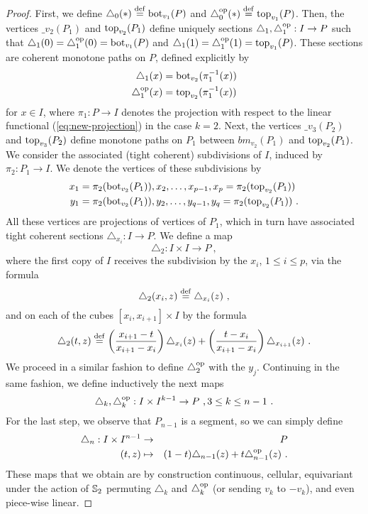 \begin{proof}
	First, we define $\triangle_0 (*) \stackrel{\mathrm{def}}{=} \operatorname{bot}_{v_1}(P)$ and $\triangle_0^{\mathrm{op}} (*) \stackrel{\mathrm{def}}{=} \operatorname{top}_{v_1}(P)$.
	Then, the vertices $\bm_{v_2}(P_1)$ and $\operatorname{top}_{v_2}(P_1)$ define uniquely sections $\triangle_1, \triangle_1^{\mathrm{op}} : I \to P$ such that $\triangle_1(0)=\triangle_1^{\mathrm{op}}(0)=\operatorname{bot}_{v_1}(P)$ and $\triangle_1(1)=\triangle_1^{\mathrm{op}}(1)=\operatorname{top}_{v_1}(P)$.
	These sections are coherent monotone paths on $P$, defined explicitly by
	\begin{align*}
		\triangle_1(x) & = \operatorname{bot}_{v_2}(\pi_1^{-1}(x)) \\
		\triangle_1^{\mathrm{op}}(x) & = \operatorname{top}_{v_2}(\pi_1^{-1}(x))
	\end{align*}
	for $x \in I$, where $\pi_1 : P \to I$ denotes the projection with respect to the linear functional (\ref{eq:new-projection}) in the case $k=2$.
	Next, the vertices $\bm_{v_3}(P_2)$ and $\operatorname{top}_{v_3}(P_2)$ define monotone paths on $P_1$ between $bm_{v_2}(P_1)$ and $\operatorname{top}_{v_2}(P_1)$.
	We consider the associated (tight coherent) subdivisions of $I$, induced by $\pi_2 : P_1 \to I$.
	We denote the vertices of these subdivisions by
	\begin{align*}
		x_1 & =\pi_2(\operatorname{bot}_{v_2}(P_1)), x_2, \ldots, x_{p-1}, x_p=\pi_2(\operatorname{top}_{v_2}(P_1)) \\
		y_1 & = \pi_2(\operatorname{bot}_{v_2}(P_1)), y_2, \ldots, y_{q-1}, y_q=\pi_2(\operatorname{top}_{v_2}(P_1)) \ .
	\end{align*}
	All these vertices are projections of vertices of $P_1$, which in turn have associated tight coherent sections $\triangle_{x_i}: I \to P$.
	We define a map
	\[
	\triangle_2 : I \times I \to P \ ,
	\]
	where the first copy of $I$ receives the subdivision by the $x_i$, $1\leq i \leq p$, via the formula
	\[
	\triangle_2(x_i, z) \stackrel{\mathrm{def}}{=} \triangle_{x_i}(z) \ ,
	\]
	and on each of the cubes $[x_i,x_{i+1}]\times I$ by the formula
	\[
	\triangle_2(t,z) \stackrel{\mathrm{def}}{=} \left( \frac{x_{i+1}-t}{x_{i+1}-x_i} \right) \triangle_{x_i}(z) + \left( \frac{t-x_i}{x_{i+1}-x_i} \right) \triangle_{x_{i+1}}(z) \ .
	\]
	We proceed in a similar fashion to define $\triangle_2^{\mathrm{op}}$ with the $y_j$.
	Continuing in the same fashion, we define inductively the next maps
	\[
	\triangle_k, \triangle_k^{\mathrm{op}} : I \times I^{k-1} \to P \ , 3 \leq k \leq n-1 \ .
	\]
	For the last step, we observe that $P_{n-1}$ is a segment, so we can simply define
	\begin{eqnarray*}
		\triangle_n : I \times I^{n-1} & \to & P \\
		(t,z) & \mapsto & (1-t)\triangle_{n-1}(z) + t \triangle_{n-1}^{\mathrm{op}} (z) \ .
	\end{eqnarray*}
	These maps that we obtain are by construction continuous, cellular, equivariant under the action of $\mathbb{S}_2$ permuting $\triangle_k$ and $\triangle_k^{\mathrm{op}}$ (or sending $v_k$ to $-v_k$), and even piece-wise linear.
\end{proof}
